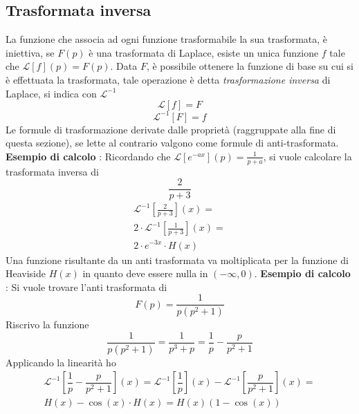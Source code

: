 \documentclass[10pt, letterpaper]{report}
\begin{document}
\subsection{Trasformata inversa}
La funzione che associa ad ogni funzione trasformabile la sua trasformata, è iniettiva, se $F(p)$ è una 
trasformata di Laplace, esiste un unica funzione $f$ tale che $\mathcal{L}[f](p)=F(p)$. Data $F$, è possibile 
ottenere la funzione di base su cui si è effettuata la trasformata, tale operazione è detta 
\textit{trasformazione inversa} di Laplace, si indica con $\mathcal{L}^{-1}$
$$ \mathcal{L}[f]=F$$
$$ \mathcal{L}^{-1}[F]=f$$
Le formule di trasformazione derivate dalle proprietà (raggruppate alla fine di questa sezione), se lette 
al contrario valgono come formule di anti-trasformata.\acc 
\textbf{Esempio di calcolo} : Ricordando che $\mathcal{L}[e^{-ax}](p)=\frac{1}{p+a}$, si vuole calcolare 
la trasformata inversa di 
$$\frac{2}{p+3} $$
\begin{eqnarray}
  \mathcal{L}^{-1}[\frac{2}{p+3}](x)=  \\ 
  2\cdot \mathcal{L}^{-1}[\frac{1}{p+3}](x) = \\ 
  2\cdot e^{-3x}\cdot H(x)
\end{eqnarray}
Una funzione risultante da un anti trasformata va moltiplicata per la funzione di Heaviside $H(x)$ in 
quanto deve essere nulla in $(-\infty,0)$.
\textbf{Esempio di calcolo} : Si vuole trovare l'anti trasformata di 
$$ F(p)=\dfrac{1}{p(p^2+1)}$$
Riscrivo la funzione 
$$ 
\dfrac{1}{p(p^2+1)}=\dfrac{1}{p^3+p}=\dfrac{1}{p}-\dfrac{p}{p^2+1}
$$
Applicando la linearità ho 
\begin{eqnarray}\mathcal{L}^{-1}[\dfrac{1}{p}-\dfrac{p}{p^2+1}](x)= 
\mathcal{L}^{-1}[\dfrac{1}{p}](x)-\mathcal{L}^{-1}[\dfrac{p}{p^2+1}](x)=\\ 
H(x)-\cos(x)\cdot H(x) = H(x)(1-\cos(x))
\end{eqnarray}
\end{document}
